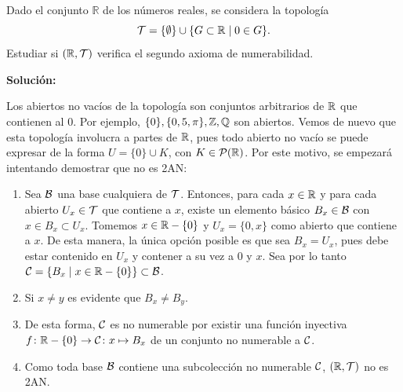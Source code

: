 \begin{ex}
    Dado el conjunto \(\mathbb{R}\) de los números reales, se considera la topología 
    \[
        \mathcal{T} = \{\emptyset\} \cup \{G \subset \mathbb{R} \mid 0 \in G\}.
    \]
    Estudiar si \((\mathbb{R},\mathcal{T})\) verifica el segundo axioma de numerabilidad.
    \bigskip

    \textbf{Solución:}

    Los abiertos no vacíos de la topología son conjuntos arbitrarios de $\mathbb{R}$ que contienen al $0$. Por ejemplo, $\{0\}, \{0,5,\pi\}, \mathbb{Z}, \mathbb{Q}$ son abiertos. Vemos de nuevo que esta topología involucra a partes de $\mathbb{R}$, pues todo abierto no vacío se puede expresar de la forma $U = \{0\} \cup K$, con $K \in \mathcal{P}(\mathbb{R})$. Por este motivo, se empezará intentando demostrar que no es 2AN:

    \begin{enumerate}[topsep=5pt, itemsep=0pt]
        \item Sea $\mathcal{B}$ una base cualquiera de $\mathcal{T}$. Entonces, para cada $x \in \mathbb{R}$ y para cada abierto $U_x \in \mathcal{T}$ que contiene a $x$, existe un elemento básico $B_x\in\mathcal{B}$ con $x\in B_x \subset U_x$. Tomemos $x\in \mathbb{R} -\{0\}$ y $U_x = \{0,x\}$ como abierto que contiene a $x$. De esta manera, la única opción posible es que sea $B_x = U_x$, pues debe estar contenido en $U_x$ y contener a su vez a $0$ y $x$. Sea por lo tanto $\mathcal{C} = \{B_x \mid x\in  \mathbb{R} -\{0\}\} \subset \mathcal{B}$.
        \item Si $x\neq y$ es evidente que $B_x \neq B_y$.
        \item De esta forma, $\mathcal{C}$ es no numerable por existir una función inyectiva $f\colon \mathbb{R} -\{0\}\to\mathcal{C} \colon x \mapsto B_x$ de un conjunto no numerable a $\mathcal{C}$.
        \item Como toda base $\mathcal{B}$ contiene una subcolección no numerable $\mathcal{C}$, $(\mathbb{R},\mathcal{T})$ no es 2AN.
    \end{enumerate}

\end{ex}

